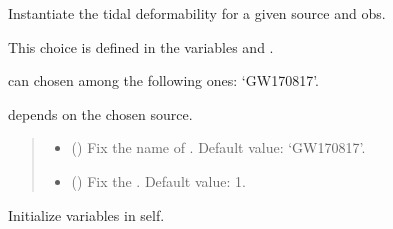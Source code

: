 \documentclass[letterpaper,10pt,english]{sphinxmanual}
\begin{document}
\begin{fulllineitems}
\label{\detokenize{source/api/setup_astro_gw:nucleardatapy.astro.setup_gw.setupGW}}
\pysigstartsignatures
{}
\pysigstopsignatures
\sphinxAtStartPar
Instantiate the tidal deformability for a given source and obs.

\sphinxAtStartPar
This choice is defined in the variables  and .

\sphinxAtStartPar
{} can chosen among the following ones: ‘GW170817’.

\sphinxAtStartPar
{} depends on the chosen source.
\begin{quote}\begin{description}
\begin{itemize}
\item {} 
\sphinxAtStartPar
{} (\sphinxstyleliteralemphasis{\sphinxupquote{, }}) \textendash{} Fix the name of . Default value: ‘GW170817’.

\item {} 
\sphinxAtStartPar
{} (\sphinxstyleliteralemphasis{\sphinxupquote{, }}) \textendash{} Fix the . Default value: 1.

\end{itemize}

\end{description}\end{quote}

\sphinxAtStartPar
{}

\begin{fulllineitems}
\label{\detokenize{source/api/setup_astro_gw:nucleardatapy.astro.setup_gw.setupGW.init_self}}
\pysigstartsignatures
{}
\pysigstopsignatures
\sphinxAtStartPar
Initialize variables in self.


\end{fulllineitems}
\end{fulllineitems}
\end{document}
